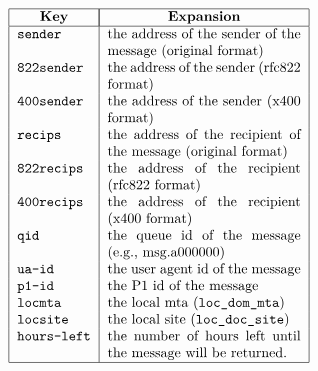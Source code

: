 \[\begin{tabular} {|l|p{0.4\textwidth}|}
\hline
	\multicolumn{1}{|c|}{\bf Key} & 
		\multicolumn{1}{|c|}{\bf Expansion} \\
\hline
	\tt sender & 
		the address of the sender of the message (original format) \\
	\tt 822sender & 
		the address of the sender (rfc822 format) \\
	\tt 400sender & 
		the address of the sender (x400 format) \\
	\tt recips & 
		the address of the recipient of the message (original format) \\ 
	\tt 822recips & 
		the address of the recipient (rfc822 format) \\
	\tt 400recips & 
		the address of the recipient (x400 format) \\
	\tt qid & 
		the queue id of the message (e.g., msg.a000000) \\
	\tt ua-id & 
		the user agent id of the message \\
	\tt p1-id & 
		the P1 id of the message \\
	\tt locmta &
		the local mta (\verb|loc_dom_mta|) \\
	\tt locsite &
		the local site (\verb|loc_doc_site|) \\
	\tt hours-left &
		the number of hours left until the message will be
returned. \\
\hline
\end{tabular}\]
